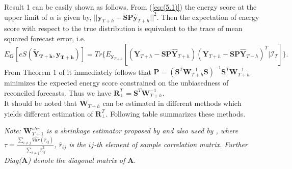 \documentclass[a4paper, 11pt]{article}
\begin{document}
\noindent
Result 1 can be easily shown as follows. From (\ref{eq:(5.1)}) the energy score at the upper limit of $\alpha$ is given by, $||\bm{y}_{T+h}-\bm{SP}\hat{\bm{y}}_{T+h}||^2$. Then the expectation of energy score with respect to the true distribution is equivalent to the trace of mean squared forecast error, i.e. $$E_{\bm{G}}[eS(\bm{\tilde{Y}_{T+h},y_{T+h}})]= Tr\{E_{\bm{y}_{T+h}}[(\bm{Y}_{T+h}-\bm{SP}\hat{\bm{Y}}_{T+h})(\bm{Y}_{T+h}-\bm{SP}\hat{\bm{Y}}_{T+h})^T|\mathcal{I}_{T}]\}.$$ 
\noindent
From Theorem 1 of \citet{Wickramasuriya2017} it immediately follows that $\bm{P} = (\bm{S}^T\bm{W}_{T+h}^{-1}\bm{S})^{-1}\bm{S}^T\bm{W}_{T+h}^{-1}$ minimizes the expected energy score constrained on the unbiasedness of reconciled forecasts. Thus we have $\bm{R}^T_\bot = \bm{S}^T\bm{W}_{T+h}^{-1}$. \\

\noindent
It should be noted that $\bm{W}_{T+h}$ can be estimated in different methods which yields different estimation of $\bm{R}^T_\bot$. Following table summarizes these methods. 

\begin{center}
	
	
\end{center}
\textit{Note: $\mathbold{W}_{T+1}^{shr}$ is a shrinkage estimator proposed by \citet{Schafer2005} and also used by \citet{Wickramasuriya2017}, where $\tau = \frac{\sum_{i \ne j}\hat{Var}(\hat{r}_{ij})}{\sum_{i \ne j}\hat{r}_{ij}^2}$, $\hat{r}_{ij}$ is the $ij$-th element of sample correlation matrix. Further Diag($\bm{A}$) denote the diagonal matrix of $\bm{A}$}.\\
\end{document}

